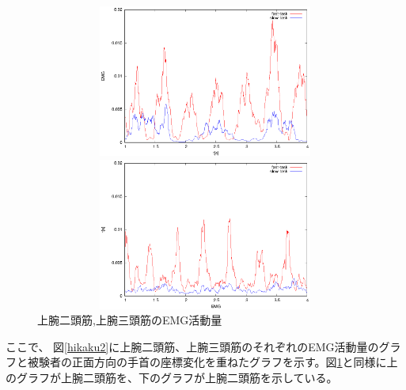 \documentclass{jsarticle}
\begin{document}


\begin{figure}[htb]
  \begin{center}
    \includegraphics[width=14cm,height=5cm]{kkdata1.eps}


    \includegraphics[width=14cm,height=5cm]{kkdata2.eps}
    \caption{上腕二頭筋,上腕三頭筋のEMG活動量}
    \label{kkdata2}
  \end{center}
\end{figure}


\newpage
ここで、
図\ref{hikaku2}に上腕二頭筋、上腕三頭筋のそれぞれのEMG活動量のグラフと被験者の正面方向の手首の座標変化を重ねたグラフを示す。図\ref{kkdata2}と同様に上のグラフが上腕二頭筋を、下のグラフが上腕二頭筋を示している。
\end{document}
